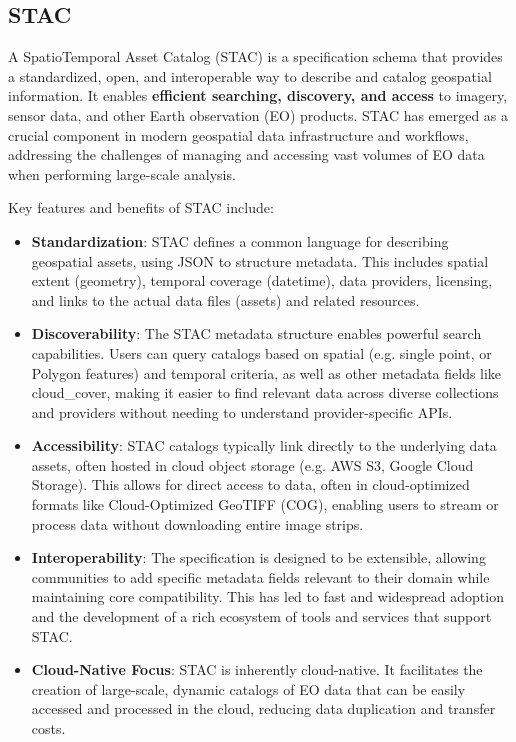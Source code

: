\begin{multicols}{2}
\subsection{STAC}
\label{subsec:stac} %

A SpatioTemporal Asset Catalog (STAC) is a specification schema that provides a standardized, open, and interoperable way to describe and catalog geospatial information. 
It enables \textbf{efficient searching, discovery, and access} to imagery, sensor data, and other Earth observation (EO) products. 
STAC has emerged as a crucial component in modern geospatial data infrastructure and workflows, addressing the challenges of 
managing and accessing vast volumes of EO data when performing large-scale analysis.

Key features and benefits of STAC include:
\begin{itemize}
    \item \textbf{Standardization}: STAC defines a common language for describing geospatial assets, using JSON to structure metadata. 
    This includes spatial extent (geometry), temporal coverage (datetime), data providers, licensing, and links to the actual data files (assets) and related resources. 
    \item \textbf{Discoverability}: The STAC metadata structure enables powerful search capabilities. 
    Users can query catalogs based on spatial (e.g. single point, or Polygon features) and temporal criteria, as well as other metadata fields like cloud\_cover, making it easier to find relevant data across diverse collections and providers without needing to understand provider-specific APIs.
    \item \textbf{Accessibility}: STAC catalogs typically link directly to the underlying data assets, often hosted in cloud object storage (e.g. AWS S3, Google Cloud Storage). 
    This allows for direct access to data, often in cloud-optimized formats like Cloud-Optimized GeoTIFF (COG), 
    enabling users to stream or process data without downloading entire image strips.
    \item \textbf{Interoperability}: The specification is designed to be extensible, allowing communities to add specific metadata fields relevant to their domain 
    while maintaining core compatibility. This has led to fast and widespread adoption and the development of a rich ecosystem of tools and services that support STAC. 
    \item \textbf{Cloud-Native Focus}: STAC is inherently cloud-native. It facilitates the creation of large-scale, dynamic catalogs of EO data that can be easily accessed and processed in the cloud, reducing data duplication and transfer costs.
\end{itemize}


\end{multicols}

